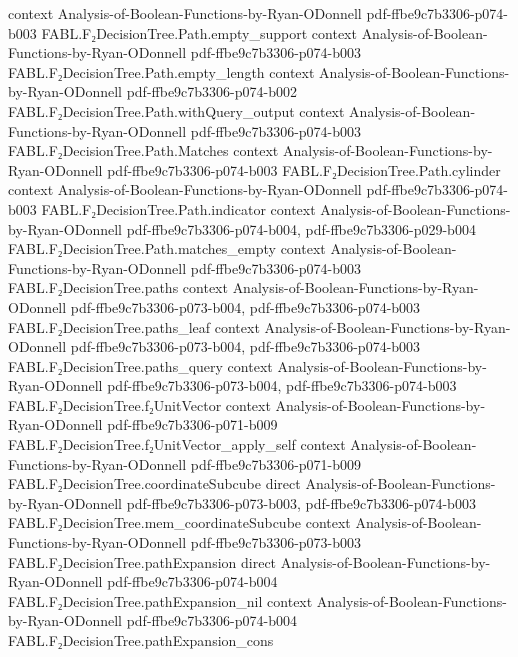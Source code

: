 \begin{theorem}
  {context}
  {Analysis-of-Boolean-Functions-by-Ryan-ODonnell}
  {pdf-ffbe9c7b3306-p074-b003}
\proofstep
  {FABL.F₂DecisionTree.Path.empty_support}
  {context}
  {Analysis-of-Boolean-Functions-by-Ryan-ODonnell}
  {pdf-ffbe9c7b3306-p074-b003}
\proofstep
  {FABL.F₂DecisionTree.Path.empty_length}
  {context}
  {Analysis-of-Boolean-Functions-by-Ryan-ODonnell}
  {pdf-ffbe9c7b3306-p074-b002}
\proofstep
  {FABL.F₂DecisionTree.Path.withQuery_output}
  {context}
  {Analysis-of-Boolean-Functions-by-Ryan-ODonnell}
  {pdf-ffbe9c7b3306-p074-b003}
\proofstep
  {FABL.F₂DecisionTree.Path.Matches}
  {context}
  {Analysis-of-Boolean-Functions-by-Ryan-ODonnell}
  {pdf-ffbe9c7b3306-p074-b003}
\proofstep
  {FABL.F₂DecisionTree.Path.cylinder}
  {context}
  {Analysis-of-Boolean-Functions-by-Ryan-ODonnell}
  {pdf-ffbe9c7b3306-p074-b003}
\proofstep
  {FABL.F₂DecisionTree.Path.indicator}
  {context}
  {Analysis-of-Boolean-Functions-by-Ryan-ODonnell}
  {pdf-ffbe9c7b3306-p074-b004,
    pdf-ffbe9c7b3306-p029-b004}
\proofstep
  {FABL.F₂DecisionTree.Path.matches_empty}
  {context}
  {Analysis-of-Boolean-Functions-by-Ryan-ODonnell}
  {pdf-ffbe9c7b3306-p074-b003}
\proofstep
  {FABL.F₂DecisionTree.paths}
  {context}
  {Analysis-of-Boolean-Functions-by-Ryan-ODonnell}
  {pdf-ffbe9c7b3306-p073-b004,
    pdf-ffbe9c7b3306-p074-b003}
\proofstep
  {FABL.F₂DecisionTree.paths_leaf}
  {context}
  {Analysis-of-Boolean-Functions-by-Ryan-ODonnell}
  {pdf-ffbe9c7b3306-p073-b004,
    pdf-ffbe9c7b3306-p074-b003}
\proofstep
  {FABL.F₂DecisionTree.paths_query}
  {context}
  {Analysis-of-Boolean-Functions-by-Ryan-ODonnell}
  {pdf-ffbe9c7b3306-p073-b004,
    pdf-ffbe9c7b3306-p074-b003}
\proofstep
  {FABL.F₂DecisionTree.f₂UnitVector}
  {context}
  {Analysis-of-Boolean-Functions-by-Ryan-ODonnell}
  {pdf-ffbe9c7b3306-p071-b009}
\proofstep
  {FABL.F₂DecisionTree.f₂UnitVector_apply_self}
  {context}
  {Analysis-of-Boolean-Functions-by-Ryan-ODonnell}
  {pdf-ffbe9c7b3306-p071-b009}
\proofstep
  {FABL.F₂DecisionTree.coordinateSubcube}
  {direct}
  {Analysis-of-Boolean-Functions-by-Ryan-ODonnell}
  {pdf-ffbe9c7b3306-p073-b003,
    pdf-ffbe9c7b3306-p074-b003}
\proofstep
  {FABL.F₂DecisionTree.mem_coordinateSubcube}
  {context}
  {Analysis-of-Boolean-Functions-by-Ryan-ODonnell}
  {pdf-ffbe9c7b3306-p073-b003}
\proofstep
  {FABL.F₂DecisionTree.pathExpansion}
  {direct}
  {Analysis-of-Boolean-Functions-by-Ryan-ODonnell}
  {pdf-ffbe9c7b3306-p074-b004}
\proofstep
  {FABL.F₂DecisionTree.pathExpansion_nil}
  {context}
  {Analysis-of-Boolean-Functions-by-Ryan-ODonnell}
  {pdf-ffbe9c7b3306-p074-b004}
\proofstep
  {FABL.F₂DecisionTree.pathExpansion_cons}

\end{theorem}
